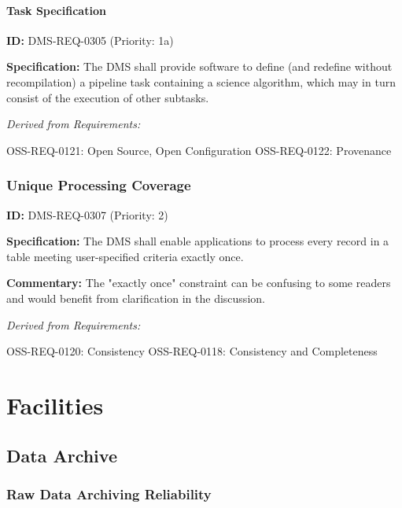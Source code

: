 \documentclass[SE,toc,lsstdraft]{lsstdoc}
\begin{document}
\paragraph{Task Specification}\hfill  %

\label{DMS-REQ-0305}
\textbf{ID:} DMS-REQ-0305 (Priority: 1a)

\textbf{Specification:} The DMS shall provide software to define (and redefine without recompilation) a pipeline task containing a science algorithm, which may in turn consist of the execution of other subtasks.

\emph{Derived from Requirements:}

OSS-REQ-0121:
Open Source, Open Configuration \newline
OSS-REQ-0122:
Provenance \newline

\subsubsection{Unique Processing Coverage}

\label{DMS-REQ-0307}
\textbf{ID:} DMS-REQ-0307 (Priority: 2)

\textbf{Specification:} The DMS shall enable applications to process every record in a table meeting user-specified criteria exactly once.

\textbf{Commentary: }The "exactly once" constraint can be confusing to some readers and would benefit from clarification in the discussion.

\emph{Derived from Requirements:}

OSS-REQ-0120:
Consistency \newline
OSS-REQ-0118:
Consistency and Completeness \newline

\section{Facilities}

\subsection{Data Archive}

\subsubsection{Raw Data Archiving Reliability}
\end{document}
